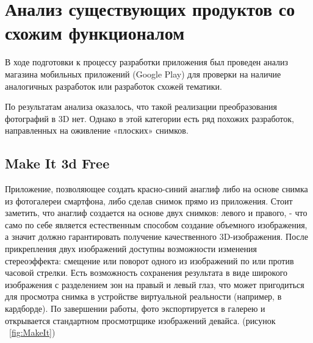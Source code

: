 
\section{Анализ существующих продуктов со схожим функционалом}
В ходе подготовки к процессу разработки приложения был проведен анализ магазина мобильных приложений (Google Play) для проверки на наличие аналогичных разработок или разработок схожей тематики.

По результатам анализа оказалось, что такой реализации преобразования фотографий в 3D нет. Однако в этой категории есть ряд похожих разработок, направленных на оживление «плоских» снимков. 

\subsection{Make It 3d Free}

Приложение, позволяющее создать красно-синий анаглиф либо на основе снимка из фотогалереи смартфона, либо сделав снимок прямо из приложения. Стоит заметить, что анаглиф создается на основе двух снимков:  левого и правого, - что само по себе является естественным способом создание объемного изображения, а значит должно гарантировать получение качественного 3D-изображения. После прикрепления двух изображений доступны возможности изменения стереоэффекта: смещение или поворот одного из изображений по или против часовой стрелки. Есть возможность сохранения результата в виде широкого изображения с разделением зон на правый и левый глаз, что может пригодиться для просмотра снимка в устройстве виртуальной реальности (например, в кардборде). По завершении работы, фото экспортируется в галерею и открывается стандартном просмотрщике изображений девайса. (рисунок ~\ref{fig:MakeIt})

